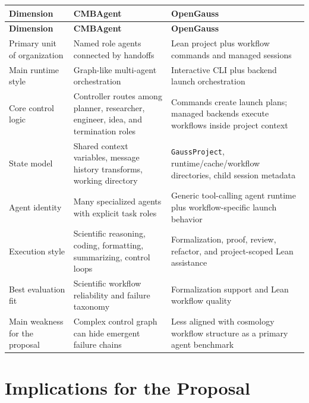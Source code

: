 \documentclass[11pt,a4paper]{article}
\begin{document}
\begin{longtable}{>{\raggedright\arraybackslash}p{} >{\raggedright\arraybackslash}p{} >{\raggedright\arraybackslash}p{}}
\toprule
\textbf{Dimension} & \textbf{CMBAgent} & \textbf{OpenGauss} \\
\midrule
\endfirsthead
\toprule
\textbf{Dimension} & \textbf{CMBAgent} & \textbf{OpenGauss} \\
\midrule
\endhead
\bottomrule
\endfoot
Primary unit of organization &
Named role agents connected by handoffs &
Lean project plus workflow commands and managed sessions \\

Main runtime style &
Graph-like multi-agent orchestration &
Interactive CLI plus backend launch orchestration \\

Core control logic &
Controller routes among planner, researcher, engineer, idea, and termination roles &
Commands create launch plans; managed backends execute workflows inside project context \\

State model &
Shared context variables, message history transforms, working directory &
\texttt{GaussProject}, runtime/cache/workflow directories, child session metadata \\

Agent identity &
Many specialized agents with explicit task roles &
Generic tool-calling agent runtime plus workflow-specific launch behavior \\

Execution style &
Scientific reasoning, coding, formatting, summarizing, control loops &
Formalization, proof, review, refactor, and project-scoped Lean assistance \\

Best evaluation fit &
Scientific workflow reliability and failure taxonomy &
Formalization support and Lean workflow quality \\

Main weakness for the proposal &
Complex control graph can hide emergent failure chains &
Less aligned with cosmology workflow structure as a primary agent benchmark \\
\end{longtable}

\section{Implications for the Proposal}
\end{document}

